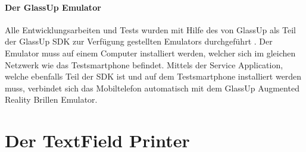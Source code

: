 \paragraph{Der GlassUp Emulator}
Alle Entwicklungsarbeiten und Tests wurden mit Hilfe des von GlassUp als Teil der GlassUp SDK zur Verfügung gestellten Emulators durchgeführt \cite{glassup_emulator_2017}.
Der Emulator muss auf einem Computer installiert werden, welcher sich im gleichen Netzwerk wie das Testsmartphone befindet. Mittels der Service Application, welche ebenfalls Teil der SDK ist und auf dem Testsmartphone installiert werden muss, verbindet sich das Mobiltelefon automatisch mit dem GlassUp Augmented Reality Brillen Emulator.

\section{Der TextField Printer}